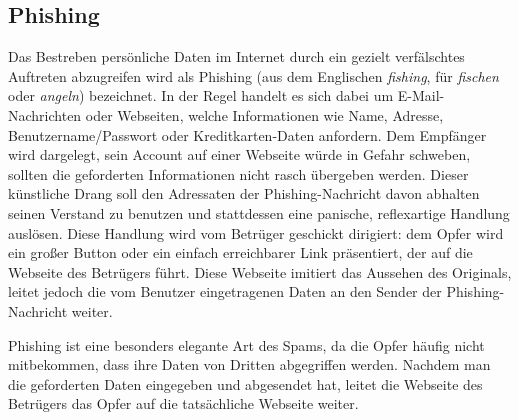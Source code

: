 \subsection{Phishing} %
\label{sub:phishing}
Das Bestreben persönliche Daten im Internet durch ein gezielt verfälschtes
Auftreten abzugreifen wird als Phishing (aus dem Englischen \emph{fishing}, für
\emph{fischen} oder \emph{angeln}) bezeichnet. In der Regel handelt es sich
dabei um E-Mail-Nachrichten oder Webseiten, welche Informationen wie Name,
Adresse, Benutzername/Passwort oder Kreditkarten-Daten anfordern. Dem Empfänger
wird dargelegt, sein Account auf einer Webseite würde in Gefahr schweben,
sollten die geforderten Informationen nicht rasch übergeben werden. Dieser
künstliche Drang soll den Adressaten der Phishing-Nachricht davon abhalten
seinen Verstand zu benutzen und stattdessen eine panische, reflexartige
Handlung auslösen. Diese Handlung wird vom Betrüger geschickt dirigiert: dem
Opfer wird ein großer Button oder ein einfach erreichbarer Link präsentiert,
der auf die Webseite des Betrügers führt. Diese Webseite imitiert das Aussehen
des Originals, leitet jedoch die vom Benutzer eingetragenen Daten an den Sender
der Phishing-Nachricht weiter.

Phishing ist eine besonders elegante Art des Spams, da die Opfer häufig nicht
mitbekommen, dass ihre Daten von Dritten abgegriffen werden. Nachdem man die
geforderten Daten eingegeben und abgesendet hat, leitet die Webseite des
Betrügers das Opfer auf die tatsächliche Webseite weiter.
